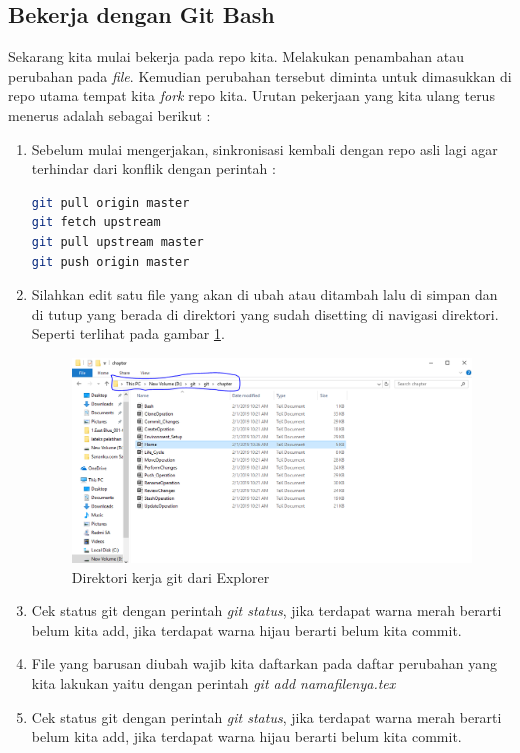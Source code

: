 \subsection{Bekerja dengan Git Bash}
Sekarang kita mulai bekerja pada repo kita. Melakukan penambahan atau perubahan pada \textit{file}. Kemudian perubahan tersebut diminta untuk dimasukkan di repo utama tempat kita \textit{fork} repo kita. Urutan pekerjaan yang kita ulang terus menerus adalah sebagai berikut :
\begin{enumerate}
\item Sebelum mulai mengerjakan, sinkronisasi kembali dengan repo asli lagi agar terhindar dari konflik dengan perintah :
\begin{lstlisting}[language=sh, caption=Perintah Sinkronisasi dengan repo asal,breaklines]
git pull origin master
git fetch upstream
git pull upstream master
git push origin master
\end{lstlisting}
\item Silahkan edit satu file yang akan di ubah atau ditambah lalu di simpan dan di tutup yang berada di direktori yang sudah disetting di navigasi direktori. Seperti terlihat pada gambar \ref{penanda}.
    \begin{figure}[!htbp]
        \centering
            \includegraphics[width=.75\textwidth]{Figures/Capture}
            \caption{Direktori kerja git dari Explorer}
        \label{penanda}
    \end{figure}
\item Cek status git dengan perintah \textit{git status}, jika terdapat warna merah berarti belum kita add, jika terdapat warna hijau berarti belum kita commit.
\item File yang barusan diubah wajib kita daftarkan pada daftar perubahan yang kita lakukan yaitu dengan perintah \textit{git add namafilenya.tex}
\item Cek status git dengan perintah \textit{git status}, jika terdapat warna merah berarti belum kita add, jika terdapat warna hijau berarti belum kita commit.

\end{enumerate}
